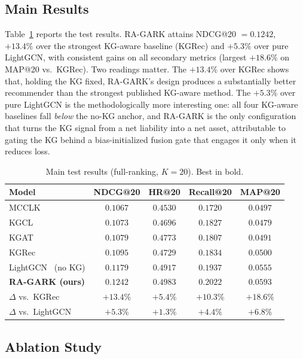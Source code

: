\documentclass[12pt,a4paper]{article}
\begin{document}
\subsection{Main Results}

Table~\ref{tab:main} reports the test results. RA-GARK attains NDCG@20 $=0.1242$, $+13.4\%$ over the strongest KG-aware baseline (KGRec) and $+5.3\%$ over pure LightGCN, with consistent gains on all secondary metrics (largest $+18.6\%$ on MAP@20 vs.\ KGRec). Two readings matter. The $+13.4\%$ over KGRec shows that, holding the KG fixed, RA-GARK's design produces a substantially better recommender than the strongest published KG-aware method. The $+5.3\%$ over pure LightGCN is the methodologically more interesting one: all four KG-aware baselines fall \emph{below} the no-KG anchor, and RA-GARK is the only configuration that turns the KG signal from a net liability into a net asset, attributable to gating the KG behind a bias-initialized fusion gate that engages it only when it reduces loss.

\begin{table}[!ht]
\centering
\caption{Main test results (full-ranking, $K=20$). Best in bold.}
\label{tab:main}
\small
\begin{tabular}{lcccc}
\toprule
Model & NDCG@20 & HR@20 & Recall@20 & MAP@20 \\
\midrule
MCCLK~\cite{zou2022mcclk}   & $0.1067$ & $0.4530$ & $0.1720$ & $0.0497$ \\
KGCL~\cite{yang2022kgcl}    & $0.1073$ & $0.4696$ & $0.1827$ & $0.0479$ \\
KGAT~\cite{wang2019kgat}    & $0.1079$ & $0.4773$ & $0.1807$ & $0.0491$ \\
KGRec~\cite{yang2023kgrec}  & $0.1095$ & $0.4729$ & $0.1834$ & $0.0500$ \\
LightGCN~\cite{he2020lightgcn} (no KG) & $0.1179$ & $0.4917$ & $0.1937$ & $0.0555$ \\
\midrule
\textbf{RA-GARK (ours)} & $\mathbf{0.1242}$ & $\mathbf{0.4983}$ & $\mathbf{0.2022}$ & $\mathbf{0.0593}$ \\
\midrule
$\Delta$ vs.\ KGRec    & $+13.4\%$ & $+5.4\%$ & $+10.3\%$ & $+18.6\%$ \\
$\Delta$ vs.\ LightGCN & $+5.3\%$  & $+1.3\%$ & $+4.4\%$ & $+6.8\%$ \\
\bottomrule
\end{tabular}
\end{table}

\subsection{Ablation Study}
\end{document}
